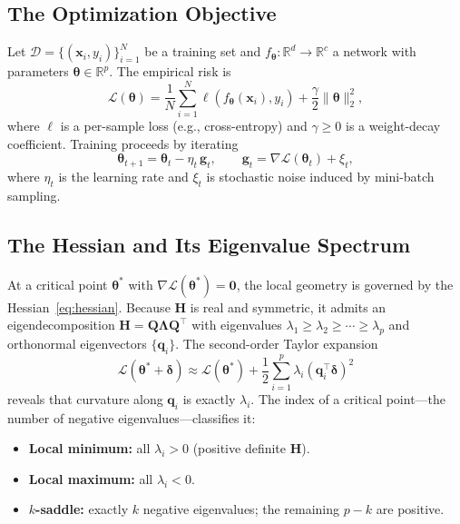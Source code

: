 \documentclass[twocolumn,10pt]{article}
\newcommand{\Hmat}{\mathbf{H}}
\newcommand{\grad}{\nabla}
\newcommand{\R}{\mathbb{R}}
\begin{document}
\subsection{The Optimization Objective}

Let $\mathcal{D} = \{(\mathbf{x}_i, y_i)\}_{i=1}^{N}$ be a training set and $f_{\boldsymbol{\theta}}: \R^d \to \R^c$ a network with parameters $\boldsymbol{\theta} \in \R^p$. The empirical risk is
\begin{equation}
\mathcal{L}(\boldsymbol{\theta}) = \frac{1}{N}\sum_{i=1}^{N} \ell\!\left(f_{\boldsymbol{\theta}}(\mathbf{x}_i), y_i\right) + \frac{\gamma}{2}\|\boldsymbol{\theta}\|_2^2,
\label{eq:empirical-risk}
\end{equation}
where $\ell$ is a per-sample loss (e.g., cross-entropy) and $\gamma \geq 0$ is a weight-decay coefficient. Training proceeds by iterating
\begin{equation}
\boldsymbol{\theta}_{t+1} = \boldsymbol{\theta}_t - \eta_t\, \mathbf{g}_t, \qquad \mathbf{g}_t = \grad \mathcal{L}(\boldsymbol{\theta}_t) + \xi_t,
\label{eq:sgd-update}
\end{equation}
where $\eta_t$ is the learning rate and $\xi_t$ is stochastic noise induced by mini-batch sampling.

\subsection{The Hessian and Its Eigenvalue Spectrum}

At a critical point $\boldsymbol{\theta}^\ast$ with $\grad \mathcal{L}(\boldsymbol{\theta}^\ast) = \mathbf{0}$, the local geometry is governed by the Hessian~\eqref{eq:hessian}. Because $\Hmat$ is real and symmetric, it admits an eigendecomposition $\Hmat = \mathbf{Q}\boldsymbol{\Lambda}\mathbf{Q}^\top$ with eigenvalues $\lambda_1 \geq \lambda_2 \geq \cdots \geq \lambda_p$ and orthonormal eigenvectors $\{\mathbf{q}_i\}$. The second-order Taylor expansion
\begin{equation}
\mathcal{L}(\boldsymbol{\theta}^\ast + \boldsymbol{\delta}) \approx \mathcal{L}(\boldsymbol{\theta}^\ast) + \frac{1}{2}\sum_{i=1}^{p} \lambda_i (\mathbf{q}_i^\top \boldsymbol{\delta})^2
\label{eq:taylor}
\end{equation}
reveals that curvature along $\mathbf{q}_i$ is exactly $\lambda_i$. The index of a critical point---the number of negative eigenvalues---classifies it:
\begin{itemize}
\item \textbf{Local minimum:} all $\lambda_i > 0$ (positive definite $\Hmat$).
\item \textbf{Local maximum:} all $\lambda_i < 0$.
\item \textbf{$k$-saddle:} exactly $k$ negative eigenvalues; the remaining $p-k$ are positive.
\end{itemize}
\end{document}
